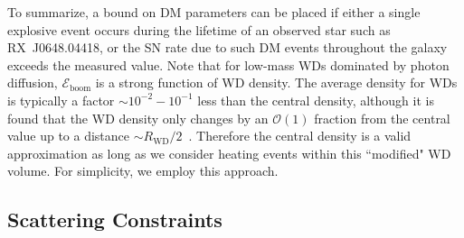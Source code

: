 \documentclass[preprintnumbers,amsmath,amssymb,prd,superscriptaddress]{revtex4}
\newcommand{\Eboom}{\mathcal{E}_\text{boom}}
\newcommand{\OO}{\mathcal{O}}
\begin{document}
To summarize, a bound on DM parameters can be placed if either a single explosive event occurs during the lifetime of an observed star such as RX~J0648.04418, or the SN rate due to such DM events throughout the galaxy exceeds the measured value.
Note that for low-mass WDs dominated by photon diffusion, $\Eboom$ is a strong function of WD density.
The average density for WDs is typically a factor $\sim 10^{-2} - 10^{-1}$ less than the central density, although it is found that the WD density only changes by an $\OO(1)$ fraction from the central value up to a distance $\sim R_\text{WD}/2$~\cite{Chandrasekhar}.
Therefore the central density is a valid approximation as long as we consider heating events within this ``modified" WD volume.
For simplicity, we employ this approach.

\subsection{Scattering Constraints}
\label{sec:TransitConstraints}
\end{document}
